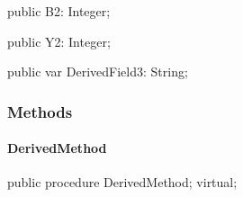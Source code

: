 \documentclass{report}
\newif\ifpdf
\begin{document}
\begin{list}{}
\par  \label{ok_inherited_members.TDerived-B2}
\item[\textbf{B2}\hfill]
\ifpdf
\begin{flushleft}
\fi
\begin{ttfamily}
public B2: Integer;\end{ttfamily}

\ifpdf
\end{flushleft}
\fi


\par  \label{ok_inherited_members.TDerived-Y2}
\item[\textbf{Y2}\hfill]
\ifpdf
\begin{flushleft}
\fi
\begin{ttfamily}
public Y2: Integer;\end{ttfamily}

\ifpdf
\end{flushleft}
\fi


\par  \label{ok_inherited_members.TDerived-DerivedField3}
\item[\textbf{DerivedField3}\hfill]
\ifpdf
\begin{flushleft}
\fi
\begin{ttfamily}
public var DerivedField3: String;\end{ttfamily}

\ifpdf
\end{flushleft}
\fi


\par  \end{list}
\subsubsection*{\large{\textbf{Methods}}\normalsize\hspace{1ex}\hfill}
\paragraph*{DerivedMethod}\hspace*{\fill}

\label{ok_inherited_members.TDerived-DerivedMethod}
\begin{list}{}{
\setlength{\itemindent}{0cm}
\setlength{\listparindent}{0cm}
\setlength{\leftmargin}{\evensidemargin}
\addtolength{\leftmargin}{\tmplength}
\settowidth{\labelsep}{X}
\addtolength{\leftmargin}{\labelsep}
\setlength{\labelwidth}{\tmplength}
}
\item[\textbf{Declaration}\hfill]
\ifpdf
\begin{flushleft}
\fi
\begin{ttfamily}
public procedure DerivedMethod; virtual;\end{ttfamily}

\ifpdf
\end{flushleft}
\fi

\end{list}
\end{document}
